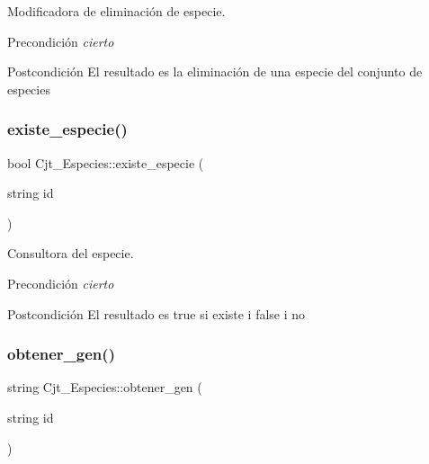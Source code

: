 Modificadora de eliminación de especie. 

\begin{DoxyPrecond}{Precondición}
{\itshape cierto} 
\end{DoxyPrecond}
\begin{DoxyPostcond}{Postcondición}
El resultado es la eliminación de una especie del conjunto de especies 
\end{DoxyPostcond}
\mbox{\label{class_cjt___especies_a39a4191697228fea8780516f4cd5da85}} 
\subsubsection{\texorpdfstring{existe\+\_\+especie()}{existe\_especie()}}
{\footnotesize\ttfamily bool Cjt\+\_\+\+Especies\+::existe\+\_\+especie (\begin{DoxyParamCaption}\item[{string}]{id }\end{DoxyParamCaption})}



Consultora del especie. 

\begin{DoxyPrecond}{Precondición}
{\itshape cierto} 
\end{DoxyPrecond}
\begin{DoxyPostcond}{Postcondición}
El resultado es true si existe i false i no 
\end{DoxyPostcond}
\mbox{\label{class_cjt___especies_af5821877f200218836053864ba8e9462}} 
\subsubsection{\texorpdfstring{obtener\+\_\+gen()}{obtener\_gen()}}
{\footnotesize\ttfamily string Cjt\+\_\+\+Especies\+::obtener\+\_\+gen (\begin{DoxyParamCaption}\item[{string}]{id }\end{DoxyParamCaption})}



